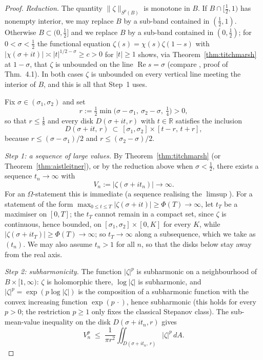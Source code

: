 \documentclass[11pt]{amsart}
\theoremstyle{definition}
\theoremstyle{remark}
\newcommand{\bbR}{\mathbb{R}}
\DeclareMathOperator{\Real}{Re}
\begin{document}
\begin{proof}
\emph{Reduction.} The quantity $\|\zeta\|_{S^p(B)}$ is monotone in
$B$. If $B\cap[\tfrac12,1)$ has nonempty interior, we may replace $B$ by
a sub-band contained in $(\tfrac12,1)$. Otherwise $B\subset(0,\tfrac12]$
and we replace $B$ by a sub-band contained in $(0,\tfrac12)$; for
$0<\sigma<\tfrac12$ the functional equation
$\zeta(s)=\chi(s)\zeta(1-s)$ with
$|\chi(\sigma+it)|\asymp|t|^{1/2-\sigma}\geq c>0$ for $|t|\geq1$
\cite[(4.12.3)]{Titchmarsh} shows, via Theorem~\ref{thm:titchmarsh} at
$1-\sigma$, that $\zeta$ is unbounded on the line $\Real s=\sigma$
(compare \cite{P30}, proof of Thm.~4.1). In both cases $\zeta$ is
unbounded on every vertical line meeting the interior of $B$, and this is
all that Step~1 uses.

Fix $\sigma\in(\sigma_1,\sigma_2)$ and set
\[
r:=\tfrac12\min\bigl(\sigma-\sigma_1,\ \sigma_2-\sigma,\ \tfrac14\bigr)>0 ,
\]
so that $r\leq\tfrac18$ and every disk $D(\sigma+it,r)$ with
$t\in\bbR$ satisfies the inclusion
\begin{equation}\label{eq:inclusion}
D(\sigma+it,\,r)\ \subset\ [\sigma_1,\sigma_2]\times[t-r,\,t+r],
\end{equation}
because $r\leq(\sigma-\sigma_1)/2$ and $r\leq(\sigma_2-\sigma)/2$.

\medskip
\emph{Step 1: a sequence of large values.}
By Theorem~\ref{thm:titchmarsh} (or Theorem~\ref{thm:aistleitner}),
or by the reduction above when $\sigma<\tfrac12$, there exists a sequence $t_n\to\infty$ with
\[
V_n:=|\zeta(\sigma+it_n)|\longrightarrow\infty .
\]
For an $\Omega$-statement this is immediate (a sequence realising the
$\limsup$). For a statement of the form
$\max_{0\leq t\leq T}|\zeta(\sigma+it)|\geq\Phi(T)\to\infty$, let
$t_T$ be a maximiser on $[0,T]$; the $t_T$ cannot remain in a compact
set, since $\zeta$ is continuous, hence bounded, on
$[\sigma_1,\sigma_2]\times[0,K]$ for every $K$, while
$|\zeta(\sigma+it_T)|\geq\Phi(T)\to\infty$; so $t_T\to\infty$ along a
subsequence, which we take as $(t_n)$. We may also assume $t_n>1$ for
all $n$, so that the disks below stay away from the real axis.

\medskip
\emph{Step 2: subharmonicity.}
The function $|\zeta|^p$ is subharmonic on a neighbourhood of
$B\times[1,\infty)$: $\zeta$ is holomorphic there, $\log|\zeta|$ is
subharmonic, and $|\zeta|^p=\exp(p\log|\zeta|)$ is the composition of
a subharmonic function with the convex increasing function
$\exp(p\,\cdot)$, hence subharmonic (this holds for every $p>0$; the
restriction $p\geq1$ only fixes the classical Stepanov class). The
sub-mean-value inequality on the disk $D(\sigma+it_n,r)$ gives
\[
V_n^p\;\leq\;\frac{1}{\pi r^2}\iint_{D(\sigma+it_n,\,r)}
|\zeta|^p\,dA .
\]


\end{proof}
\end{document}
